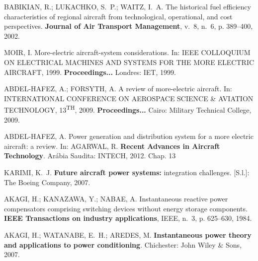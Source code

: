 \providecommand{\abntreprintinfo}[1]{%
 \citeonline{#1}}
\begin{thebibliography}{}
	\providecommand{\abntrefinfo}[3]{}
	\providecommand{\abntbstabout}[1]{}
	\abntbstabout{1.42.2.1 }

\abntrefinfo{Babikian, Lukachko e Waitz}{BABIKIAN; LUKACHKO; WAITZ}{2002}
{BABIKIAN, R.; LUKACHKO, S.~P.; WAITZ, I.~A. The historical fuel efficiency
  characteristics of regional aircraft from technological, operational, and
  cost perspectives.
\textbf{Journal of Air Transport Management}, v.~8, n.~6, p. 389--400,
  2002.}

\abntrefinfo{Moir}{MOIR}{1999}
{MOIR, I. More-electric aircraft-system considerations. In:  \uppercase{IEEE
  Colloquium on Electrical Machines and Systems for the More Electric
  Aircraft}, 1999. \textbf{Proceedings...} Londres: IET, 1999.}

\abntrefinfo{Abdel-Hafez e Forsyth}{ABDEL-HAFEZ; FORSYTH}{2009}
{ABDEL-HAFEZ, A.; FORSYTH, A. A review of more-electric aircraft. In:
  \uppercase{International Conference on Aerospace Science \& Aviation
  Technology, 13\textsuperscript{\lowercase{th}}}, 2009. \textbf{Proceedings...} Cairo: Military Technical College, 2009.}

\abntrefinfo{Abdel-Hafez}{ABDEL-HAFEZ}{2012}
{ABDEL-HAFEZ, A. Power generation and distribution system for a
	more electric aircraft: a review. In: AGARWAL, R. \textbf{Recent Advances in Aircraft Technology}.
	Ar\'abia Saudita: INTECH, 2012. Chap. 13}

\abntrefinfo{Karimi}{KARIMI}{2007}
{KARIMI, K.~J. \textbf{Future aircraft power systems:} integration challenges. [S.l.]: The Boeing Company, 2007.}

\abntrefinfo{Akagi, Kanazawa e Nabae}{AKAGI; KANAZAWA; NABAE}{1984}
{AKAGI, H.; KANAZAWA, Y.; NABAE, A. Instantaneous reactive power 
  compensators comprising switching devices without energy storage components.
  \textbf{IEEE Transactions on industry applications}, IEEE, n.~3, p. 625--630,
  1984.}

\abntrefinfo{Akagi, Watanabe e Aredes}{AKAGI; WATANABE; AREDES}{2007}
{AKAGI, H.; WATANABE, E.~H.; AREDES, M. \textbf{Instantaneous power theory and
  applications to power conditioning}. Chichester: John Wiley \& Sons, 2007.}


\end{thebibliography}

